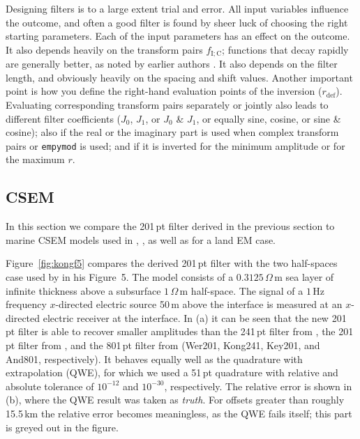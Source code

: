 \documentclass[paper,twocolumn,twoside]{geophysics}
\newcommand{\mr}[1]{\mathrm{#1}}
\begin{document}
Designing filters is to a large extent trial and error. All input variables
influence the outcome, and often  a good filter is found by sheer luck of
choosing the right starting parameters. Each of the input parameters has an
effect on the outcome. It also depends heavily on the transform pairs
$f_\mr{I;C}$; functions that decay rapidly are generally better, as noted by
earlier authors \citep[e.g.][]{USGS.75.Anderson}. It also depends on the filter
length, and obviously heavily on the spacing and shift values. Another
important point is how you define the right-hand evaluation points of the
inversion ($r_\mr{def}$). Evaluating corresponding transform pairs separately
or jointly also leads to different filter coefficients ($J_0$, $J_1$, or $J_0$
\& $J_1$, or equally sine, cosine, or sine \& cosine); also if the real or the
imaginary part is used when complex transform pairs or \texttt{empymod} is
used; and if it is inverted for the minimum amplitude or for the maximum $r$.

\subsection{CSEM}
In this section we compare the 201\,pt filter derived in the previous section
to marine CSEM models used in \cite{GP.07.Kong}, \cite{GEO.12.Key}, as well as
for a land EM case.

Figure~\ref{fig:kongf5} compares the derived 201\,pt filter with the two
half-spaces case used by \cite{GP.07.Kong} in his Figure~5. The model consists
of a $0.3125\,\Omega\,$m sea layer of infinite thickness above a subsurface
$1\,\Omega\,$m half-space. The signal of a $1\,$Hz frequency $x$-directed
electric source 50\,m above the interface is measured at an $x$-directed
electric receiver at the interface.
%
%
In (a) it can be seen that the new 201\,pt filter is able to recover smaller
amplitudes than the 241\,pt filter from \cite{GP.07.Kong}, the 201\,pt filter
from \cite{GEO.12.Key}, and the 801\,pt filter from \cite{TMS.82.Anderson}
(Wer201, Kong241, Key201, and And801, respectively). It behaves equally well as
the quadrature with extrapolation (QWE), for which we used a 51\,pt quadrature
with relative and absolute tolerance of $10^{-12}$ and $10^{-30}$,
respectively. The relative error is shown in (b), where the QWE result was
taken as \emph{truth}. For offsets greater than roughly 15.5\,km the relative
error becomes meaningless, as the QWE fails itself; this part is greyed out in
the figure.
\end{document}
